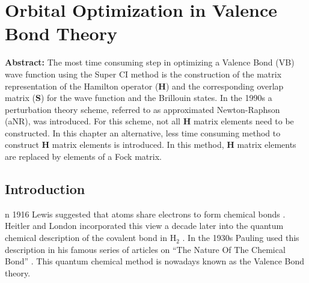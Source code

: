 \chapter{Orbital Optimization in Valence Bond Theory}
\label{chap_orbopt}


\noindent\textbf{Abstract:} The most time consuming step in optimizing a Valence Bond (VB) wave function using the Super CI method is the construction of the matrix representation of the Hamilton operator ($\mathbf{H}$) and the corresponding overlap matrix ($\mathbf{S}$) for the wave function and the Brillouin states. In the 1990s a perturbation theory scheme, referred to as approximated Newton-Raphson (aNR), was introduced. For this scheme, not all $\mathbf{H}$ matrix elements need to be constructed. In this chapter an alternative, less time consuming method  to construct $\mathbf{H}$ matrix elements is introduced. In this method, $\mathbf{H}$ matrix elements are replaced by elements of a Fock matrix.

\newpage

\section{Introduction}

\lettrine{}{}n 1916 Lewis suggested that atoms share electrons to form chemical bonds \cite{lewis}. Heitler and London incorporated this view a decade later into the quantum chemical description of the covalent bond in H$_2$ \cite{heitler}. In the 1930s Pauling used this description in his famous series of articles on ``The Nature Of The Chemical Bond'' \cite{pauling1,pauling2,pauling3,pauling4,pauling5,pauling6,pauling7,paulingbook}. This quantum chemical method is nowadays known as the Valence Bond theory.

